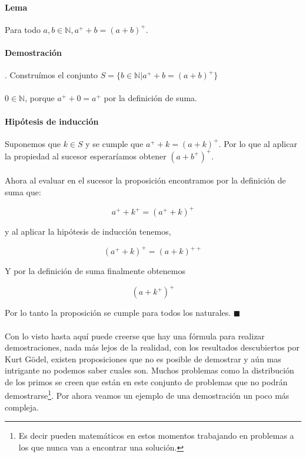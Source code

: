 \documentclass{article}
\begin{document}
\paragraph{Lema} Para todo $a,b \in \mathbb{N}, a^+ + b = (a + b)^+$.

\paragraph{Demostración}. Construímos el conjunto $S =  \{ b \in \mathbb{N}| a^+ + b = (a + b)^+ \}$

\paragraph{} $0 \in \mathbb{N}$, porque $a^+ + 0 = a^+$ por la definición de suma.

\paragraph{Hipótesis de inducción} Suponemos que $k \in S$ y se cumple que $a^+ + k = (a + k)^+$. Por lo que al aplicar la propiedad al sucesor esperaríamos obtener $(a + b^+)^+$.

\paragraph{}Ahora al evaluar en el sucesor la proposición encontramos por la definición de suma que:

$$ a^+ + k^+ = (a^+ + k)^+$$

y al aplicar la hipótesis de inducción tenemos,

$$(a^+ + k)^+ = (a + k)^{++}$$

Y por la definición de suma finalmente obtenemos

$$(a + k^+)^+$$

Por lo tanto la proposición se cumple para todos los naturales. $\blacksquare$

\paragraph{} Con lo visto hasta aquí puede creerse que hay una fórmula para realizar demostraciones, nada más lejos de la realidad, con los resultados descubiertos por Kurt Gödel, existen proposiciones que no es posible de demostrar y aún mas intrigante no podemos saber cuales son. Muchos problemas como la distribución de los primos se creen que están en este conjunto de problemas que no podrán demostrarse\footnote{Es decir pueden matemáticos en estos momentos trabajando en problemas a los que nunca van a encontrar una solución.}. Por ahora veamos un ejemplo de una demostración un poco más compleja.
\end{document}
